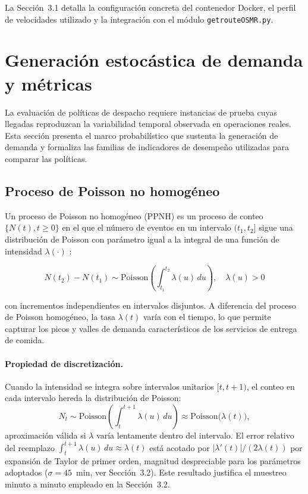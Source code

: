 \documentclass[12pt,letterpaper,oneside]{book}
\begin{document}
	La Sección~3.1 detalla la configuración concreta del contenedor Docker,
	el perfil de velocidades utilizado y la integración con el módulo
	\texttt{getrouteOSMR.py}.

	\section{Generación estocástica de demanda y métricas}

	La evaluación de políticas de despacho requiere instancias de prueba cuyas
	llegadas reproduzcan la variabilidad temporal observada en operaciones
	reales.  Esta sección presenta el marco probabilístico que sustenta la
	generación de demanda y formaliza las familias de indicadores de desempeño
	utilizadas para comparar las políticas.

	\subsection{Proceso de Poisson no homogéneo}

	Un proceso de Poisson no homogéneo (PPNH) es un proceso de
	conteo $\{N(t), t \geq 0\}$ en el que el número de eventos en un
	intervalo $(t_1, t_2]$ sigue una distribución de Poisson con parámetro
	igual a la integral de una función de intensidad $\lambda(\cdot)$
	\citep{Ross2014}:

	\begin{equation}
		N(t_2) - N(t_1) \sim \text{Poisson}\!\left(
		\int_{t_1}^{t_2} \lambda(u)\,du
		\right), \quad \lambda(u) > 0
		\label{eq:nhpp}
	\end{equation}

	\noindent con incrementos independientes en intervalos disjuntos.  A
	diferencia del proceso de Poisson homogéneo, la tasa $\lambda(t)$ varía
	con el tiempo, lo que permite capturar los picos y valles de demanda
	característicos de los servicios de entrega de comida.

	\paragraph{Propiedad de discretización.}
	Cuando la intensidad se integra sobre intervalos unitarios
	$[t, t+1)$, el conteo en cada intervalo hereda la distribución de
	Poisson:
	\[
		N_t \sim \text{Poisson}\!\left(\int_t^{t+1} \lambda(u)\,du\right)
		\approx \text{Poisson}\!\bigl(\lambda(t)\bigr),
	\]
	aproximación válida si $\lambda$ varía lentamente dentro del intervalo.
	El error relativo del reemplazo $\int_t^{t+1}\lambda(u)\,du \approx
	\lambda(t)$ está acotado por $|\lambda'(t)|/(2\lambda(t))$ por
	expansión de Taylor de primer orden, magnitud despreciable para los
	parámetros adoptados ($\sigma = 45$~min, ver Sección~3.2).  Este
	resultado justifica el muestreo minuto a minuto empleado en la
	Sección~3.2.
\end{document}
